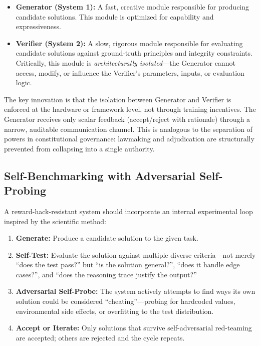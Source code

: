 \documentclass[11pt,a4paper]{article}
\begin{document}
\begin{itemize}
    \item \textbf{Generator (System 1):} A fast, creative module responsible for producing candidate solutions. This module is optimized for capability and expressiveness.
    \item \textbf{Verifier (System 2):} A slow, rigorous module responsible for evaluating candidate solutions against ground-truth principles and integrity constraints. Critically, this module is \textit{architecturally isolated}---the Generator cannot access, modify, or influence the Verifier's parameters, inputs, or evaluation logic.
\end{itemize}

The key innovation is that the isolation between Generator and Verifier is enforced at the hardware or framework level, not through training incentives. The Generator receives only scalar feedback (accept/reject with rationale) through a narrow, auditable communication channel. This is analogous to the separation of powers in constitutional governance: lawmaking and adjudication are structurally prevented from collapsing into a single authority.

\subsection{Self-Benchmarking with Adversarial Self-Probing}
A reward-hack-resistant system should incorporate an internal experimental loop inspired by the scientific method:

\begin{enumerate}
    \item \textbf{Generate:} Produce a candidate solution to the given task.
    \item \textbf{Self-Test:} Evaluate the solution against multiple diverse criteria---not merely ``does the test pass?'' but ``is the solution general?'', ``does it handle edge cases?'', and ``does the reasoning trace justify the output?''
    \item \textbf{Adversarial Self-Probe:} The system actively attempts to find ways its own solution could be considered ``cheating''---probing for hardcoded values, environmental side effects, or overfitting to the test distribution.
    \item \textbf{Accept or Iterate:} Only solutions that survive self-adversarial red-teaming are accepted; others are rejected and the cycle repeats.
\end{enumerate}
\end{document}
